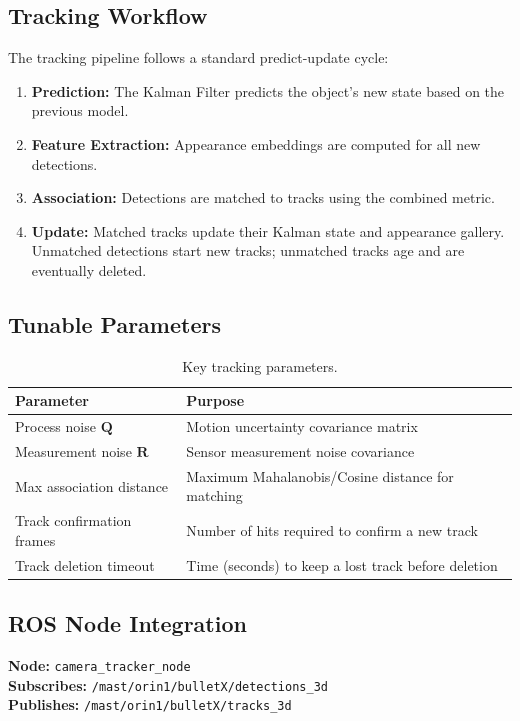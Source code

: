 \documentclass[12pt,a4paper]{report}
\begin{document}
\subsection{Tracking Workflow}
The tracking pipeline follows a standard predict-update cycle:
\begin{enumerate}
    \item \textbf{Prediction:} The Kalman Filter predicts the object's new state based on the previous model.
    \item \textbf{Feature Extraction:} Appearance embeddings are computed for all new detections.
    \item \textbf{Association:} Detections are matched to tracks using the combined metric.
    \item \textbf{Update:} Matched tracks update their Kalman state and appearance gallery. Unmatched detections start new tracks; unmatched tracks age and are eventually deleted.
\end{enumerate}

\subsection{Tunable Parameters}
\begin{table}[H]
\centering
\caption{Key tracking parameters.}
\label{tab:tracking-params}
\begin{tabularx}{\textwidth}{@{}l X@{}}
\toprule
\textbf{Parameter} & \textbf{Purpose} \\
\midrule
Process noise $\mathbf{Q}$ & Motion uncertainty covariance matrix \\
Measurement noise $\mathbf{R}$ & Sensor measurement noise covariance \\
Max association distance & Maximum Mahalanobis/Cosine distance for matching \\
Track confirmation frames & Number of hits required to confirm a new track \\
Track deletion timeout & Time (seconds) to keep a lost track before deletion \\
\bottomrule
\end{tabularx}
\end{table}

\subsection{ROS Node Integration}
\textbf{Node:} \texttt{camera\_tracker\_node} \\
\textbf{Subscribes:} \texttt{/mast/orin1/bulletX/detections\_3d} \\
\textbf{Publishes:} \texttt{/mast/orin1/bulletX/tracks\_3d}
\end{document}
